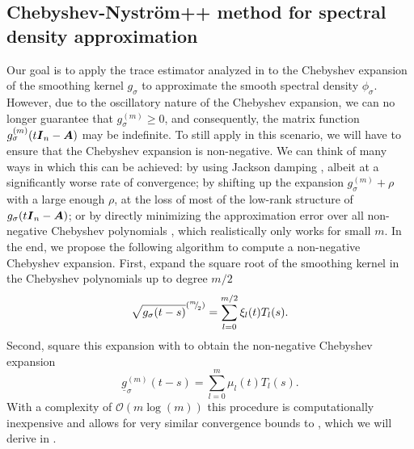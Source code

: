 \documentclass[12pt]{article}
\begin{document}
\subsection{Chebyshev-Nyström++ method for spectral density approximation}
\label{subsec:chebyshev-nystrom}

Our goal is to apply the trace estimator analyzed in  to the Chebyshev expansion of the smoothing kernel $g_{\sigma}$ to approximate the smooth spectral density $\phi_{\sigma}$. However, due to the oscillatory nature of the Chebyshev expansion, we can no longer guarantee that $g_{\sigma}^{(m)} \geq 0$, and consequently, the matrix function $g_{\sigma}^{(m)}(t \boldsymbol{I}_n - \boldsymbol{A})$ may be indefinite. To still apply  in this scenario, we will have to ensure that the Chebyshev expansion is non-negative. We can think of many ways in which this can be achieved: by using Jackson damping \cite{jackson-1912-approximation-trigonometric,braverman-2022-sublinear-time}, albeit at a significantly worse rate of convergence; by shifting up the expansion $g_{\sigma}^{(m)} + \rho$ with a large enough $\rho$, at the loss of most of the low-rank structure of $g_{\sigma}(t \boldsymbol{I}_n - \boldsymbol{A})$; or by directly minimizing the approximation error over all non-negative Chebyshev polynomials \cite{fejer-1916-uber-trigonometrische}, which realistically only works for small $m$. In the end, we propose the following algorithm to compute a non-negative Chebyshev expansion. First, expand the square root of the smoothing kernel in the Chebyshev polynomials up to degree $m/2$
\begin{equation}
    \sqrt{g_{\sigma}(t - s)}^{({}^{m}{\mskip -5mu/\mskip -3mu}_{2})} = \sum_{l=0}^{m/2} \xi_l(t) T_l(s).
\end{equation}
Second, square this expansion with  to obtain the non-negative Chebyshev expansion
\begin{equation}
    \underline{g}^{(m)}_{\sigma}(t - s) = \sum_{l=0}^{m} \mu_l(t) T_l(s).
\end{equation}
With a complexity of $\mathcal{O}(m \log(m))$ this procedure is computationally inexpensive and allows for very similar convergence bounds to , which we will derive in .

\end{document}

